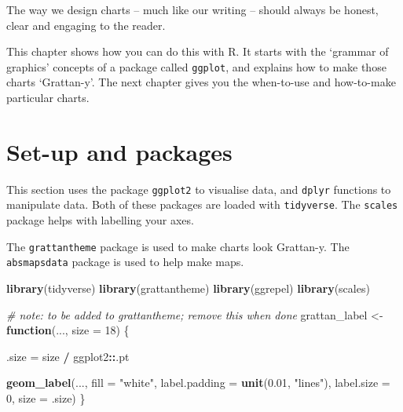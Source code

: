 \documentclass[]{book}
\newenvironment{Shaded}{\begin{snugshade}}{\end{snugshade}}
\newcommand{\CommentTok}[1]{\textcolor[rgb]{0.56,0.35,0.01}{\textit{#1}}}
\newcommand{\ControlFlowTok}[1]{\textcolor[rgb]{0.13,0.29,0.53}{\textbf{#1}}}
\newcommand{\DataTypeTok}[1]{\textcolor[rgb]{0.13,0.29,0.53}{#1}}
\newcommand{\DecValTok}[1]{\textcolor[rgb]{0.00,0.00,0.81}{#1}}
\newcommand{\FloatTok}[1]{\textcolor[rgb]{0.00,0.00,0.81}{#1}}
\newcommand{\KeywordTok}[1]{\textcolor[rgb]{0.13,0.29,0.53}{\textbf{#1}}}
\newcommand{\NormalTok}[1]{#1}
\newcommand{\OperatorTok}[1]{\textcolor[rgb]{0.81,0.36,0.00}{\textbf{#1}}}
\newcommand{\StringTok}[1]{\textcolor[rgb]{0.31,0.60,0.02}{#1}}
\begin{document}
The way we design charts -- much like our writing -- should always be honest, clear and engaging to the reader.

This chapter shows how you can do this with R. It starts with the `grammar of graphics' concepts of a package called \texttt{ggplot}, and explains how to make those charts `Grattan-y'. The next chapter gives you the when-to-use and how-to-make particular charts.

\hypertarget{set-up-and-packages}{%
\section{Set-up and packages}\label{set-up-and-packages}}

This section uses the package \texttt{ggplot2} to visualise data, and \texttt{dplyr} functions to manipulate data. Both of these packages are loaded with \texttt{tidyverse}. The \texttt{scales} package helps with labelling your axes.

The \texttt{grattantheme} package is used to make charts look Grattan-y. The \texttt{absmapsdata} package is used to help make maps.

\begin{Shaded}
\begin{Highlighting}[]
\KeywordTok{library}\NormalTok{(tidyverse)}
\KeywordTok{library}\NormalTok{(grattantheme)}
\KeywordTok{library}\NormalTok{(ggrepel)}
\KeywordTok{library}\NormalTok{(scales)}
\end{Highlighting}
\end{Shaded}

\begin{Shaded}
\begin{Highlighting}[]
\CommentTok{# note: to be added to grattantheme; remove this when done}
\NormalTok{grattan_label <-}\StringTok{ }\ControlFlowTok{function}\NormalTok{(..., }\DataTypeTok{size =} \DecValTok{18}\NormalTok{) \{}

\NormalTok{  .size =}\StringTok{ }\NormalTok{size }\OperatorTok{/}\StringTok{ }\NormalTok{ggplot2}\OperatorTok{::}\NormalTok{.pt}
  
\KeywordTok{geom_label}\NormalTok{(..., }
           \DataTypeTok{fill =} \StringTok{"white"}\NormalTok{,}
           \DataTypeTok{label.padding =} \KeywordTok{unit}\NormalTok{(}\FloatTok{0.01}\NormalTok{, }\StringTok{"lines"}\NormalTok{), }
           \DataTypeTok{label.size =} \DecValTok{0}\NormalTok{,}
           \DataTypeTok{size =}\NormalTok{ .size)}
\NormalTok{\}}
\end{Highlighting}
\end{Shaded}
\end{document}
